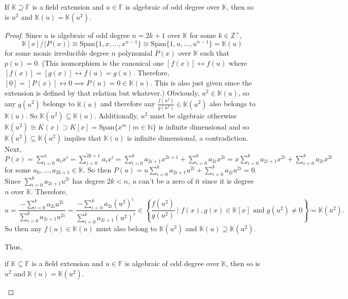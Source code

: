 \documentclass[addpoints,10pt]{exam}
\theoremstyle{plain}
\theoremstyle{definition}
\newtheorem{prob}[thm]{Problem}
\theoremstyle{plain}
\theoremstyle{plain}
\theoremstyle{definition}
\let\oldprob\prob
\let\endoldprob\endprob
\renewenvironment{prob}
  {\begin{singlespace}\oldprob}
  {\endoldprob\end{singlespace}}
\newcommand{\FF}{\ensuremath{\mathbb{F}}}
\newcommand{\KK}{\ensuremath{\mathbb{K}}}
\newcommand{\NN}{\ensuremath{\mathbb{N}}}
\newcommand{\ZZ}{\ensuremath{\mathbb{Z}}}
\newcommand{\Span}{\ensuremath{\mathrm{Span}}}
\begin{document}
\newpage
\begin{prob}
If $\KK\supseteq \FF$ is a field extension and $u\in \FF$ is algebraic of odd degree over $\KK$, then so is $u^{2}$ and $\KK(u)=\KK(u^{2})$. 
\end{prob}
\begin{proof}
Since $u$ is algebraic of odd degree $n=2k+1$ over $\KK$ for some $k\in \ZZ^{+}$, 
  $$\KK[x]/\langle P(x)\rangle\cong \Span\{1,x,\hdots,x^{n-1}\}\cong\Span\{1,u,\hdots, u^{n-1}\}=\KK(u)$$
for some monic irreducible degree $n$ polynomial $P(x)$ over $\KK$ such that $p(u)=0$. (This isomorphism is the canonical one $[f(x)]\longleftrightarrow f(u)$ where $[f(x)]=[g(x)]\longleftrightarrow f(u)=g(u)$. Therefore, $[0]=[P(x)]\longleftrightarrow 0\implies P(u)=0\in \KK(u)$. This is also just given since the extension is defined by that relation but whatever.) Obviously, $u^{2}\in \KK(u)$, so any $q(u^{2})$ belongs to $\KK(u)$ and therefore any $\frac{f(u^{2})}{g(u^{2})}\in \KK(u^{2})$ also belongs to $\KK(u)$. So $\KK(u^{2})\subseteq \KK(u)$. Additionally, $u^{2}$ must be algebraic otherwise $\KK(u^{2})\cong K(x)\supset K[x]=\Span\{x^{m}\mid m\in \NN\}$ is infinite dimensional and so $\KK(u^{2})\subseteq \KK(u^{2})$ implies that $\KK(u)$ is infinite dimensional, a contradiction. Next, $P(x)=\sum_{i=0}^{n}a_{i}x^{i}=\sum_{i=0}^{2k+1}a_{i}x^{i}=\sum_{i=0}^{k}a_{2i+1}x^{2i+1} + \sum_{i=0}^{k}a_{2i}x^{2i}=x\sum_{i=0}^{k}a_{2i+1}x^{2i} + \sum_{i=0}^{k}a_{2i}x^{2i}$ for some $a_{0},\hdots, a_{2k+1}\in \KK$. So then $P(u)=u\sum_{i=0}^{k}a_{2i+1}u^{2i} + \sum_{i=0}^{k}a_{2i}u^{2i}=0$. Since $\sum_{i=0}^{k}a_{2i+1}u^{2i}$ has degree $2k<n$, $u$ can't be a zero of it since it is degree $n$ over $\KK$. Therefore,
$$u=\frac{-\sum_{i=0}^{k}a_{2i}u^{2i}}{\sum_{i=0}^{k}a_{2i+1}u^{2i}}=\frac{-\sum_{i=0}^{k}a_{2i}(u^{2})^{i}}{\sum_{i=0}^{k}a_{2i+1}(u^{2})^{i}}\in \left\{\frac{f(u^{2})}{g(u^{2})}\mid f(x),g(x)\in \KK[x]\text{ and }g(u^{2})\neq 0\right\}=\KK(u^{2}).$$
So then any $f(u)\in \KK(u)$ must also belong to $\KK(u^{2})$ and $\KK(u)\supseteq \KK(u^{2})$.

Thus,
\begin{center}
if $\KK\subseteq \FF$ is a field extension and $u\in \FF$ is algebraic of odd degree over $\KK$, then so is $u^{2}$ and $\KK(u)=\KK(u^{2})$.
\end{center}


\end{proof}
\newpage
\end{document}
